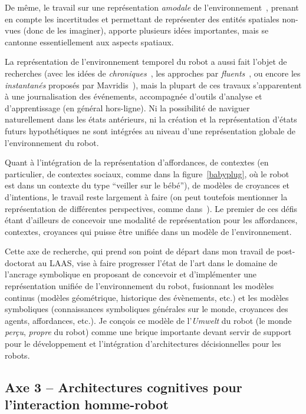 \documentclass[a4paper]{article}
\begin{document}
De même, le travail sur une représentation \emph{amodale} de
l'environnement~\cite{Mavridis2006}, prenant en compte les incertitudes et
permettant de représenter des entités spatiales non-vues (donc de les imaginer),
apporte plusieurs idées importantes, mais se cantonne essentiellement aux
aspects spatiaux.

La représentation de l'environnement temporel du robot a aussi fait l'objet de
recherches (avec les idées de \emph{chroniques}~\cite{Ghallab1996}, les
approches par \emph{fluents}~\cite{mosenlechner2010becoming}, ou encore les
\emph{instantanés} proposés par Mavridis~\cite{Mavridis2006}), mais la plupart
de ces travaux s'apparentent à une journalisation des événements, accompagnée
d'outils d'analyse et d'apprentissage (en général hors-ligne). Ni la possibilité
de naviguer naturellement dans les états antérieurs, ni la création et la
représentation d'états futurs hypothétiques ne sont intégrées au niveau d'une
représentation globale de l'environnement du robot.

Quant à l'intégration de la représentation d'affordances, de contextes (en
particulier, de contextes sociaux, comme dans la figure~\ref{babyplug}, où le
robot est dans un contexte du type ``veiller sur le bébé''), de modèles de
croyances et d'intentions, le travail reste largement à faire (on peut toutefois
mentionner la représentation de différentes perspectives, comme
dans~\cite{ros2010which}). Le premier de ces défis étant d'ailleurs de concevoir
une modalité de représentation pour les affordances, contextes, croyances qui
puisse être unifiée dans un modèle de l'environnement.

Cette axe de recherche, qui prend son point de départ dans mon travail de
post-doctorat au LAAS, vise à faire progresser l'état de l'art dans le domaine
de l'ancrage symbolique en proposant de concevoir et d'implémenter une
représentation unifiée de l'environnement du robot, fusionnant les modèles
continus (modèles géométrique, historique des évènements, etc.) et les modèles
symboliques (connaissances symboliques générales sur le monde, croyances des
agents, affordances, etc.). Je conçois ce modèle de l'\emph{Umwelt} du robot (le
monde \emph{perçu}, \emph{propre} du robot) comme une brique importante devant
servir de support pour le développement et l'intégration d'architectures
décisionnelles pour les robots.

\subsection*{Axe 3 -- Architectures cognitives pour l'interaction homme-robot}
\end{document}
